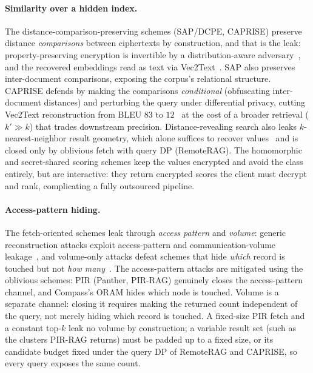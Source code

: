 \paragraph{Similarity over a hidden index.}
The distance-comparison-preserving schemes (SAP/DCPE, CAPRISE) preserve distance
\emph{comparisons} between ciphertexts by construction, and that is the leak: property-preserving
encryption is invertible by a distribution-aware adversary~\citep{naveed_ppe_2015}, and the
recovered embeddings read as text via Vec2Text~\citep{vec2text}. SAP also preserves inter-document
comparisons, exposing the corpus's relational structure. CAPRISE defends by making the comparisons
\emph{conditional} (obfuscating inter-document distances) and perturbing the query under differential privacy, cutting Vec2Text
reconstruction from BLEU $83$ to $12$~\citep{ye_caprise} at the cost of a broader retrieval
($k'{\gg}k$) that trades downstream precision. Distance-revealing search also leaks
$k$-nearest-neighbor result geometry, which alone suffices to recover
values~\citep{kornaropoulos_knn_2019} and is closed only by oblivious fetch with query DP
(RemoteRAG). The homomorphic and secret-shared scoring schemes keep the values encrypted and avoid
the class entirely, but are interactive: they return encrypted scores the client must decrypt and
rank, complicating a fully outsourced pipeline.

\paragraph{Access-pattern hiding.}
The fetch-oriented schemes leak through \emph{access pattern} and \emph{volume}: generic
reconstruction attacks exploit access-pattern and communication-volume
leakage~\citep{kellaris2016leakage}, and volume-only attacks defeat schemes that hide \emph{which}
record is touched but not \emph{how many}~\citep{blackstone_revisiting_2020}. The access-pattern
attacks are mitigated using the oblivious schemes: PIR (Panther, PIR-RAG) genuinely closes the
access-pattern channel, and Compass's ORAM hides which node is touched. Volume is a separate
channel: closing it requires making the returned count independent of the query, not merely hiding
which record is touched. A fixed-size PIR fetch and a constant top-$k$ leak no volume by
construction; a variable result set (such as the clusters PIR-RAG returns) must be padded up to a
fixed size, or its candidate budget fixed under the query DP of RemoteRAG and CAPRISE, so every
query exposes the same count.

